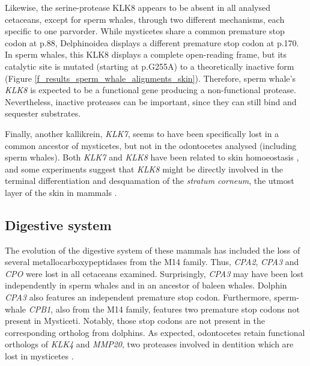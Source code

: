 Likewise, the serine-protease KLK8 appears to be absent in all analysed cetaceans, except for sperm whales, through two different mechanisms, each specific to one parvorder.
While mysticetes share a common premature stop codon at {p.88}, Delphinoidea displays a different premature stop codon at {p.170}.
In sperm whales, this KLK8 displays a complete open-reading frame, but its catalytic site is mutated (starting at {p.G255A}) to a theoretically inactive form (Figure \ref{f_results_sperm_whale_alignments_skin}).
Therefore, sperm whale's \textit{KLK8} is expected to be a functional gene producing a non-functional protease.
Nevertheless, inactive proteases can be important, since they can still bind and sequester substrates.

Finally, another kallikrein, \textit{KLK7}, seems to have been specifically lost in a common ancestor of mysticetes, but not in the odontocetes analysed (including sperm whales).
Both \textit{KLK7} and \textit{KLK8} have been related to skin homoeostasis \cite{Kishibe2007}, and some experiments suggest that \textit{KLK8} might be directly involved in the terminal differentiation and desquamation of the \emph{stratum corneum}, the utmost layer of the skin in mammals \cite{Kuwae2002}.

\subsection{Digestive system} \label{ss_sperm_whale_results_digestive}

The evolution of the digestive system of these mammals has included the loss of several metallocarboxypeptidases from the M14 family.
Thus, \textit{CPA2}, \textit{CPA3} and \textit{CPO} were lost in all cetaceans examined.
Surprisingly, \textit{CPA3} may have been lost independently in sperm whales and in an ancestor of baleen whales. %
Dolphin \textit{CPA3} also features an independent premature stop codon.
Furthermore, sperm-whale \textit{CPB1}, also from the M14 family, features two premature stop codons not present in Mysticeti. %
Notably, those stop codons are not present in the corresponding ortholog from dolphins.
As expected, odontocetes retain functional orthologs of \textit{KLK4} and \textit{MMP20}, two proteases involved in dentition which are lost in mysticetes \cite{Keane2015}.

